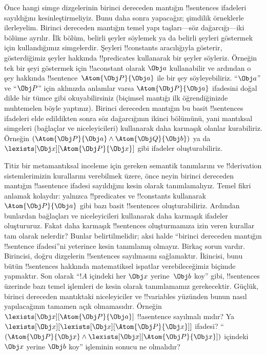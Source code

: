 \documentclass[../../../include/open-logic-section]{subfiles}
\begin{document}


Önce hangi simge dizgelerinin birinci dereceden mantığın
!!{sentence}s ifadeleri sayıldığını kesinleştirmeliyiz. Bunu daha sonra
yapacağız; şimdilik örneklerle ilerleyelim. Birinci dereceden mantığın
temel yapı taşları---söz dağarcığı---iki bölüme ayrılır. İlk bölüm,
belirli şeyler söylemek ya da belirli şeyleri göstermek için
kullandığımız simgelerdir. Şeyleri !!{constant}s aracılığıyla gösterir,
gösterdiğimiz şeyler hakkında !!{predicate}s kullanarak bir şeyler
söyleriz. Örneğin tek bir şeyi göstermek için !!a{constant} olarak
$\Obj a$ kullanabilir ve ardından o şey hakkında
!!{sentence}~$\Atom{\Obj P}{\Obj a}$ ile bir şey söyleyebiliriz.
``$\Obj a$'' ve ``$\Obj P$'' için aklınızda anlamlar varsa
$\Atom{\Obj P}{\Obj a}$ ifadesini doğal dilde bir tümce gibi
okuyabilirsiniz (biçimsel mantığı ilk öğrendiğinizde muhtemelen böyle
yaptınız). Birinci dereceden mantığın bu basit !!{sentence}s ifadeleri
elde edildikten sonra söz dağarcığının ikinci bölümünü, yani mantıksal
simgeleri (bağlaçlar ve niceleyicileri) kullanarak daha karmaşık olanlar
kurabiliriz. Örneğin $(\Atom{\Obj P}{\Obj a}\land
\Atom{\Obj Q}{\Obj b})$ ya da
$\lexists[\Obj x][\Atom{\Obj P}{\Obj x}]$ gibi ifadeler oluşturabiliriz.

Titiz bir metamantıksal inceleme için gereken semantik tanımlarını ve
!!{derivation} sistemlerimizin kurallarını verebilmek üzere, önce neyin
birinci dereceden mantığın !!a{sentence} ifadesi sayıldığını kesin
olarak tanımlamalıyız. Temel fikri anlamak kolaydır: yalnızca
!!{predicate}s ve !!{constant}s kullanarak
$\Atom{\Obj P}{\Obj a}$ gibi bazı basit !!{sentence}s oluşturabiliriz.
Ardından bunlardan bağlaçları ve niceleyicileri kullanarak daha karmaşık
ifadeler oluştururuz. Fakat daha karmaşık !!{sentence}s oluşturmamıza
izin veren kurallar tam olarak nelerdir? Bunlar belirtilmelidir; aksi
halde ``birinci dereceden mantığın !!{sentence} ifadesi''ni yeterince
kesin tanımlamış olmayız. Birkaç sorun vardır. Birincisi, doğru
dizgelerin !!{sentence}s sayılmasını sağlamaktır. İkincisi, bunu bütün
!!{sentence}s hakkında matematiksel ispatlar verebileceğimiz biçimde
yapmaktır. Son olarak ``$!A$ içindeki her $\Obj x$ yerine~$\Obj b$
koy'' gibi, !!{sentence}s üzerinde bazı temel işlemleri de kesin
olarak tanımlamamız gerekecektir. Güçlük, birinci dereceden mantıktaki
niceleyiciler ve !!{variable}s yüzünden bunun nasıl yapılacağının
tamamen açık olmamasıdır. Örneğin
$\lexists[\Obj x][\Atom{\Obj P}{\Obj a}]$ !!a{sentence} sayılmalı
mıdır? Ya $\lexists[\Obj x][\lexists[\Obj x][\Atom{\Obj P}{\Obj x}]]$
ifadesi? ``$(\Atom{\Obj P}{\Obj x}\land
\lexists[\Obj x][\Atom{\Obj P}{\Obj x}])$ içindeki $\Obj x$ yerine
$\Obj b$ koy'' işleminin sonucu ne olmalıdır?
\end{document}
